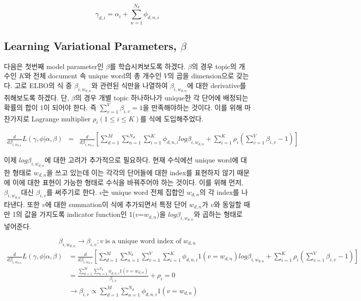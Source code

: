 \documentclass[draft=false]{oblivoir}
\begin{document}
\begin{equation}
\gamma_{d,i} = \alpha_{i}+ \sum^{N_{d}}_{n=1}\phi_{d,n,i}
\end{equation}

\subsection{Learning Variational Parameters, \texorpdfstring{$\beta$}{Lg}}
다음은 첫번째 model parameter인 $\beta$를 학습시켜보도록 하겠다. $\beta$의 경우 topic의 개수인 $K$와 전체 document 속 unique word의 총 개수인 $V$의 곱을 dimension으로 갖는다. 고로 ELBO의 식 중 $\beta_{i,w_{d,n}}$와 관련된 식만을 나열하여 $\beta_{i,w_{d,n}}$에 대한 derivative를 취해보도록 하겠다. 단, $\beta$의 경우 개별 topic 하나하나가 unique한 각 단어에 배정되는 확률의 합이 1이 되어야 한다. 즉 $\sum^{V}_{v=1}\beta_{i,v} = 1$을 만족해야하는 것이다. 이를 위해 마찬가지로 Lagrange multiplier $\rho_{i} (1 \leq i \leq K)$를 식에 도입해주었다. 

\begin{eqnarray}
\frac{d}{d\beta_{i,w_{d,n}}}L(\gamma,\phi|\alpha,\beta)\nonumber & = & \frac{d}{d\beta_{i,w_{d,n}}}[\sum^{M}_{d=1}\sum^{N_{d}}_{n=1}\sum^{K}_{i=1}\phi_{d,n,i}log\beta_{i,w_{d,n}}+\sum^{K}_{i=1}\rho_{i}(\sum^{V}_{v=1}\beta_{i,v}-1)]
\end{eqnarray}

이제 $log\beta_{i,w_{d,n}}$에 대한 고려가 추가적으로 필요하다. 현재 수식에선 unique word에 대한 형태로 $w_{d,n}$을 쓰고 있는데 이는 각각의 단어들에 대한 index를 표현하지 않기 때문에 이에 대한 표현이 가능한 형태로 수식을 바꿔주어야 하는 것이다. 
이를 위해 먼저, $\beta_{i,w_{d,n}}$대신 $\beta_{i,v}$를 써주기로 한다. $v$는 unique word 전체 집합인 $w_{d,n}$의 각 index를 나타낸다. 또한 $v$에 대한 summation이 식에 추가되면서 특정 단어 $w_{d,n}$가 $v$와 동일할 때만 1의 값을 가지도록 indicator function인 1($v$=$w_{d,n}$)을 $log\beta_{i,w_{d,n}}$와 곱하는 형태로 넣어준다.

\begin{equation}
\beta_{i,w_{d,n}} \rightarrow \beta_{i,v} : v\;\text{is a unique word index of}\;w_{d,n}\nonumber
\end{equation}
\begin{align}
\frac{d}{d\beta_{i,w_{d,n}}}L(\gamma,\phi|\alpha,\beta)\nonumber & = \frac{d}{d\beta_{i,w_{d,n}}}[\sum^{M}_{d=1}\sum^{N_{d}}_{n=1}\sum^{V}_{v=1}\sum^{K}_{i=1}\phi_{d,n,i}1(v=w_{d,n})log\beta_{i,w_{d,n}}+\sum^{K}_{i=1}\rho_{i}(\sum^{V}_{v=1}\beta_{i,v}-1)]\nonumber\\
& = \frac{\sum^{M}_{d=1}\sum^{N_{d}}_{n=1}\phi_{d,n,i}1(v=w_{d,n})}{\beta_{i,v}} + \rho_{i} = 0\nonumber\\
& \rightarrow \beta_{i,v} \propto \sum^{M}_{d=1}\sum^{N_{d}}_{n=1}\phi_{d,n,i}1(v=w_{d,n})
\end{align}
\end{document}
